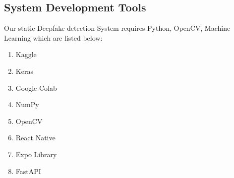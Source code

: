 \subsection{System Development Tools}
Our static Deepfake detection System requires Python, OpenCV,
Machine Learning which are listed below:
\begin{enumerate}
    \item Kaggle
    \item Keras
    \item Google Colab
    \item NumPy
    \item OpenCV
    \item React Native
    \item Expo Library
    \item FastAPI
\end{enumerate}

